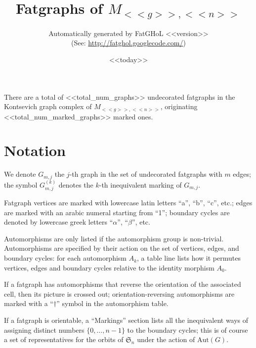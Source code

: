 \documentclass[a4paper]{article}
\begin{document}
\title{Fatgraphs of $M_{<<g>>,<<n>>}$}
\author{%
  Automatically generated by FatGHoL <<version>>
  \\
  (See: \url{http://fatghol.googlecode.com/})
  }
\date{ <<today>> }
\maketitle


\noindent{}
There are a total of <<total_num_graphs>> undecorated fatgraphs in the
Kontsevich graph complex of $M_{<<g>>,<<n>>}$, originating
<<total_num_marked_graphs>> marked ones.


\setcounter{tocdepth}{1}
\tableofcontents

\clearpage


\section{Notation}

We denote $G_{m,j}$ the $j$-th graph in the set of undecorated
fatgraphs with $m$ edges; the symbol $G_{m,j}^{(k)}$ denotes the
$k$-th inequivalent marking of $G_{m,j}$.

Fatgraph vertices are marked with lowercase latin letters
``a'', ``b'', ``c'', etc.; edges are marked with an arabic
numeral starting from ``1''; boundary cycles are denoted
by lowercase greek letters ``$\alpha$'', ``$\beta$'', etc.

Automorphisms are only listed if the automorphism group is
non-trivial.  Automorphisms are specified by their action on the set
of vertices, edges, and boundary cycles: for each automorphism $A_k$,
a table line lists how it permutes vertices, edges and boundary cycles
relative to the identity morphism $A_0$.

If a fatgraph has automorphisms that reverse the orientation of the
associated cell, then its picture is crossed out;
orientation-reversing automorphisms are marked with a ``$\dag$''
symbol in the automorphism table.

If a fatgraph is orientable, a ``Markings'' section lists all the
inequivalent ways of assigning distinct numbers $\{0, \ldots, n-1\}$
to the boundary cycles; this is of course a set of representatives for
the orbits of $\mathfrak{S}_n$ under the action of $\mathrm{Aut}(G)$.
\end{document}
